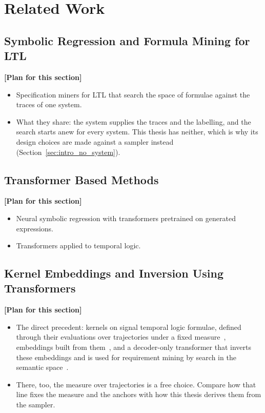 \documentclass[titlepage,a4paper,11pt]{report}
\newenvironment{RSplan}{\par\medskip\color{orange!85!black}\noindent\textbf{[Plan for this section]}\par}{\par\medskip}
\begin{document}
\chapter{Related Work}\label{chap:related_work}
    \section{Symbolic Regression and Formula Mining for LTL}
    \begin{RSplan}
    \begin{itemize}
        \item Specification miners for LTL that search the space of formulae against the traces of one system.
        \item What they share: the system supplies the traces and the labelling, and the search starts anew for every system. This thesis has neither, which is why its design choices are made against a sampler instead (Section~\ref{sec:intro_no_system}).
    \end{itemize}
    \end{RSplan}

    \section{Transformer Based Methods}
    \begin{RSplan}
    \begin{itemize}
        \item Neural symbolic regression with transformers pretrained on generated expressions.
        \item Transformers applied to temporal logic.
    \end{itemize}
    \end{RSplan}

    \section{Kernel Embeddings and Inversion Using Transformers}\label{sec:Kernel_Embeddings_and_Inversion}
    \begin{RSplan}
    \begin{itemize}
        \item The direct precedent: kernels on signal temporal logic formulae, defined through their evaluations over trajectories under a fixed measure~\cite{bortolussi_kernel_2020,bortolussi_learning_2022}, embeddings built from them~\cite{saveri_stl2vec_2024}, and a decoder-only transformer that inverts these embeddings and is used for requirement mining by search in the semantic space~\cite{candussio_bridging_2025}.
        \item There, too, the measure over trajectories is a free choice. Compare how that line fixes the measure and the anchors with how this thesis derives them from the sampler.
    \end{itemize}
    \end{RSplan}
\end{document}
